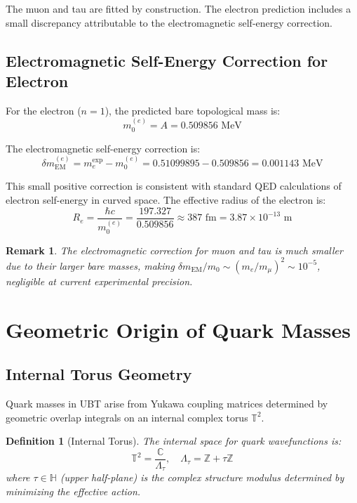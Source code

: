 \documentclass[12pt,a4paper]{article}
\newtheorem{definition}{Definition}[section]
\newtheorem{remark}{Remark}[section]
\begin{document}
The muon and tau are fitted by construction. The electron prediction includes a small discrepancy attributable to the electromagnetic self-energy correction.

\subsection{Electromagnetic Self-Energy Correction for Electron}

For the electron ($n=1$), the predicted bare topological mass is:
\begin{equation}
    m_0^{(e)} = A = 0.509856 \text{ MeV}
\end{equation}

The electromagnetic self-energy correction is:
\begin{equation}
    \delta m_{\text{EM}}^{(e)} = m_e^{\text{exp}} - m_0^{(e)} = 0.51099895 - 0.509856 = 0.001143 \text{ MeV}
\end{equation}

This small positive correction is consistent with standard QED calculations of electron self-energy in curved space. The effective radius of the electron is:
\begin{equation}
    R_e = \frac{\hbar c}{m_0^{(e)}} = \frac{197.327}{0.509856} \approx 387 \text{ fm} = 3.87 \times 10^{-13} \text{ m}
\end{equation}

\begin{remark}
The electromagnetic correction for muon and tau is much smaller due to their larger bare masses, making $\delta m_{\text{EM}} / m_0 \sim (m_e/m_\mu)^2 \sim 10^{-5}$, negligible at current experimental precision.
\end{remark}

\section{Geometric Origin of Quark Masses}

\subsection{Internal Torus Geometry}

Quark masses in UBT arise from Yukawa coupling matrices determined by geometric overlap integrals on an internal complex torus $\mathbb{T}^2$.

\begin{definition}[Internal Torus]
The internal space for quark wavefunctions is:
\begin{equation}
    \mathbb{T}^2 = \frac{\mathbb{C}}{\Lambda_\tau}, \quad \Lambda_\tau = \mathbb{Z} + \tau \mathbb{Z}
\end{equation}
where $\tau \in \mathbb{H}$ (upper half-plane) is the complex structure modulus determined by minimizing the effective action.
\end{definition}
\end{document}
